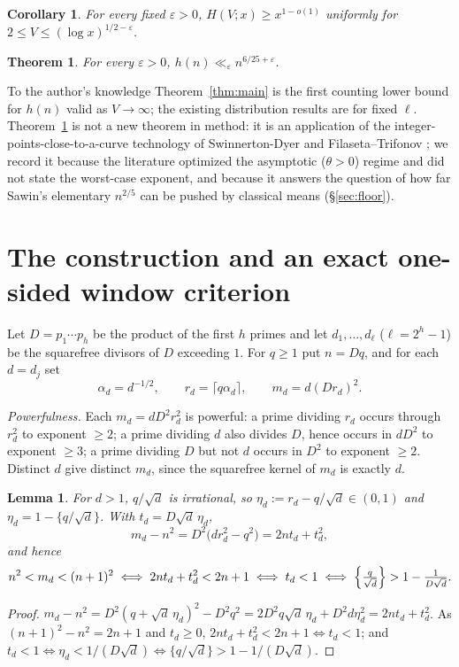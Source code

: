 \documentclass[11pt]{article}
\newtheorem{theorem}{Theorem}
\newtheorem{lemma}{Lemma}
\newtheorem{corollary}{Corollary}
\theoremstyle{definition}
\begin{document}
\begin{corollary}\label{cor:half}
For every fixed $\varepsilon>0$, $H(V;x)\ge x^{1-o(1)}$ uniformly for $2\le V\le(\log x)^{1/2-\varepsilon}$.
\end{corollary}

\begin{theorem}\label{thm:upper}
For every $\varepsilon>0$, $h(n)\ll_\varepsilon n^{6/25+\varepsilon}$.
\end{theorem}

To the author's knowledge Theorem~\ref{thm:main} is the first counting lower bound for $h(n)$ valid as
$V\to\infty$; the existing distribution results are for fixed $\ell$. Theorem~\ref{thm:upper} is not a new
theorem in method: it is an application of the integer-points-close-to-a-curve technology of Swinnerton-Dyer
\cite{SD} and Filaseta--Trifonov \cite{FT96,Tri98}; we record it because the literature optimized the
asymptotic ($\theta>0$) regime and did not state the worst-case exponent, and because it answers the question
of how far Sawin's elementary $n^{2/5}$ can be pushed by classical means (\S\ref{sec:floor}).

\section{The construction and an exact one-sided window criterion}
Let $D=p_1\cdots p_h$ be the product of the first $h$ primes and let $d_1,\dots,d_\ell$ ($\ell=2^h-1$) be the
squarefree divisors of $D$ exceeding $1$. For $q\ge1$ put $n=Dq$, and for each $d=d_j$ set
\[
  \alpha_d=d^{-1/2},\qquad r_d=\lceil q\alpha_d\rceil,\qquad m_d=d(Dr_d)^2 .
\]

\emph{Powerfulness.} Each $m_d=dD^2r_d^2$ is powerful: a prime dividing $r_d$ occurs through $r_d^2$ to
exponent $\ge2$; a prime dividing $d$ also divides $D$, hence occurs in $dD^2$ to exponent $\ge3$; a prime
dividing $D$ but not $d$ occurs in $D^2$ to exponent $\ge2$. Distinct $d$ give distinct $m_d$, since the
squarefree kernel of $m_d$ is exactly $d$.

\begin{lemma}\label{lem:window}
For $d>1$, $q/\sqrt d$ is irrational, so $\eta_d:=r_d-q/\sqrt d\in(0,1)$ and $\eta_d=1-\{q/\sqrt d\}$. With
$t_d=D\sqrt d\,\eta_d$,
\[
  m_d-n^2=D^2\bigl(dr_d^2-q^2\bigr)=2nt_d+t_d^2,
\]
and hence
\[
  n^2<m_d<(n+1)^2 \iff 2nt_d+t_d^2<2n+1 \iff t_d<1 \iff \Bigl\{\tfrac{q}{\sqrt d}\Bigr\}>1-\tfrac1{D\sqrt d}.
\]
\end{lemma}
\begin{proof}
$m_d-n^2=D^2(q+\sqrt d\,\eta_d)^2-D^2q^2=2D^2q\sqrt d\,\eta_d+D^2d\eta_d^2=2nt_d+t_d^2$. As
$(n+1)^2-n^2=2n+1$ and $t_d\ge0$, $2nt_d+t_d^2<2n+1\iff t_d<1$; and $t_d<1\iff\eta_d<1/(D\sqrt d)\iff
\{q/\sqrt d\}>1-1/(D\sqrt d)$.
\end{proof}
\end{document}
